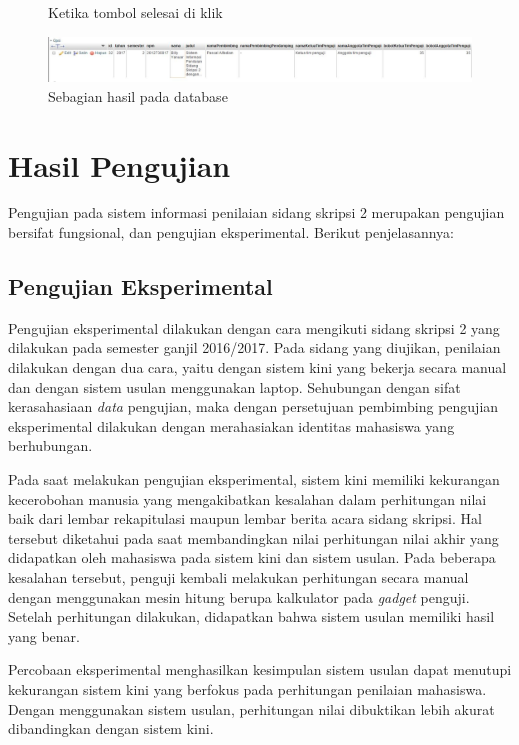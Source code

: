 \begin{enumerate}
\begin{figure}[H]
			\caption{Ketika tombol selesai di klik}
			\label{fig:selesaiisi}
		\end{figure}
		\begin{figure}[H]
			\centering
			\includegraphics[scale=0.5]{Gambar/hasildatabase}
			\caption{Sebagian hasil pada database}
			\label{fig:hasildatabase}
		\end{figure}
	\end{enumerate}
	
\section{Hasil Pengujian}
\label{sec:hasilUji}

	Pengujian pada sistem informasi penilaian sidang skripsi 2 merupakan pengujian bersifat fungsional, dan pengujian eksperimental. Berikut penjelasannya:
	
	\subsection{Pengujian Eksperimental}
	\label{sub: PEksperimen}
	
	Pengujian eksperimental dilakukan dengan cara mengikuti sidang skripsi 2 yang dilakukan pada semester ganjil 2016/2017. Pada sidang yang diujikan, penilaian dilakukan dengan dua cara, yaitu dengan sistem kini yang bekerja secara manual dan dengan sistem usulan menggunakan laptop. Sehubungan dengan sifat kerasahasiaan \textit{data} pengujian, maka dengan persetujuan pembimbing pengujian eksperimental dilakukan dengan merahasiakan identitas mahasiswa yang berhubungan.
	
	Pada saat melakukan pengujian eksperimental, sistem kini memiliki kekurangan kecerobohan manusia yang mengakibatkan kesalahan dalam perhitungan nilai baik dari lembar rekapitulasi maupun lembar berita acara sidang skripsi. Hal tersebut diketahui pada saat membandingkan nilai perhitungan nilai akhir yang didapatkan oleh mahasiswa pada sistem kini dan sistem usulan. Pada beberapa kesalahan tersebut, penguji kembali melakukan perhitungan secara manual dengan menggunakan mesin hitung berupa kalkulator pada \textit{gadget} penguji. Setelah perhitungan dilakukan, didapatkan bahwa sistem usulan memiliki hasil yang benar.
	
	Percobaan eksperimental menghasilkan kesimpulan sistem usulan dapat menutupi kekurangan sistem kini yang berfokus pada perhitungan penilaian mahasiswa. Dengan menggunakan sistem usulan, perhitungan nilai dibuktikan lebih akurat dibandingkan dengan sistem kini.
	
